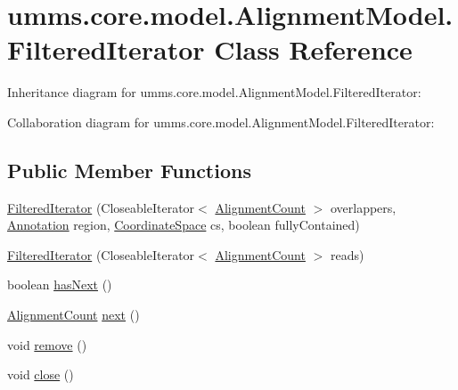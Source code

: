 \hypertarget{classumms_1_1core_1_1model_1_1_alignment_model_1_1_filtered_iterator}{\section{umms.\+core.\+model.\+Alignment\+Model.\+Filtered\+Iterator Class Reference}
\label{classumms_1_1core_1_1model_1_1_alignment_model_1_1_filtered_iterator}
}


Inheritance diagram for umms.\+core.\+model.\+Alignment\+Model.\+Filtered\+Iterator\+:


Collaboration diagram for umms.\+core.\+model.\+Alignment\+Model.\+Filtered\+Iterator\+:
\subsection*{Public Member Functions}
\begin{DoxyCompactItemize}
\item 
\hyperlink{classumms_1_1core_1_1model_1_1_alignment_model_1_1_filtered_iterator_a193e93c92b056232a8bf2322bce54702}{Filtered\+Iterator} (Closeable\+Iterator$<$ \hyperlink{classumms_1_1core_1_1model_1_1_alignment_model_1_1_alignment_count}{Alignment\+Count} $>$ overlappers, \hyperlink{interfaceumms_1_1core_1_1annotation_1_1_annotation}{Annotation} region, \hyperlink{interfaceumms_1_1core_1_1coordinatesystem_1_1_coordinate_space}{Coordinate\+Space} cs, boolean fully\+Contained)
\item 
\hyperlink{classumms_1_1core_1_1model_1_1_alignment_model_1_1_filtered_iterator_a3aefe09498d71c726ccb6d3dbc191b04}{Filtered\+Iterator} (Closeable\+Iterator$<$ \hyperlink{classumms_1_1core_1_1model_1_1_alignment_model_1_1_alignment_count}{Alignment\+Count} $>$ reads)
\item 
boolean \hyperlink{classumms_1_1core_1_1model_1_1_alignment_model_1_1_filtered_iterator_a1504f256d7a01185df9cbae77fb3fd7c}{has\+Next} ()
\item 
\hyperlink{classumms_1_1core_1_1model_1_1_alignment_model_1_1_alignment_count}{Alignment\+Count} \hyperlink{classumms_1_1core_1_1model_1_1_alignment_model_1_1_filtered_iterator_a97a5ddcbe5a61ed9d38d0c2bc4b28de3}{next} ()
\item 
void \hyperlink{classumms_1_1core_1_1model_1_1_alignment_model_1_1_filtered_iterator_a448cb2f7cf88167bc58b89b4ebc371c0}{remove} ()
\item 
void \hyperlink{classumms_1_1core_1_1model_1_1_alignment_model_1_1_filtered_iterator_ad5b5430a14933e8043a5fdf003cdd369}{close} ()
\end{DoxyCompactItemize}


